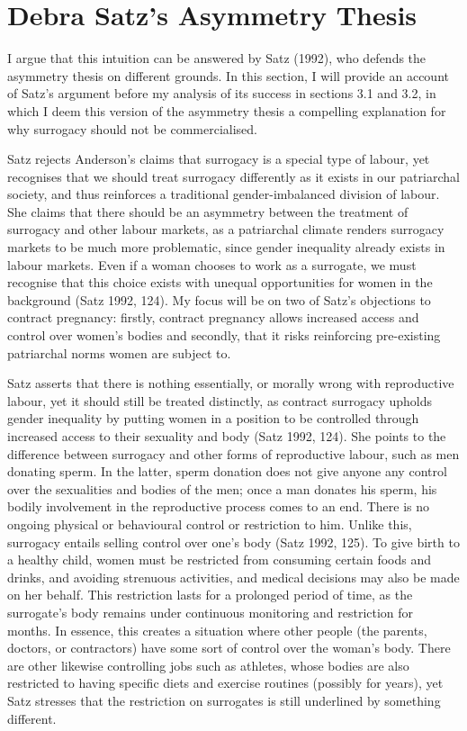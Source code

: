 \renewcommand*{\thesection}{\arabic{section}:}
\section{Debra Satz's Asymmetry Thesis}
  
I argue that this intuition can be answered by Satz
(1992), who defends the asymmetry thesis on different grounds. In this
section, I will provide an account of Satz's argument before my analysis
of its success in sections 3.1 and 3.2, in which I deem this version of
the asymmetry thesis a compelling explanation for why surrogacy should
not be commercialised. 

Satz rejects Anderson's claims that surrogacy is
a special type of labour, yet recognises that we should treat surrogacy
differently as it exists in our patriarchal society, and thus reinforces
a traditional gender-imbalanced division of labour. She claims that
there should be an asymmetry between the treatment of surrogacy and
other labour markets, as a patriarchal climate renders surrogacy markets
to be much more problematic, since gender inequality already exists in
labour markets. Even if a woman chooses to work as a surrogate, we must
recognise that this choice exists with unequal opportunities for women
in the background (Satz 1992, 124). My focus will be on two of Satz's
objections to contract pregnancy: firstly, contract pregnancy allows
increased access and control over women's bodies and secondly, that it
risks reinforcing pre-existing patriarchal norms women are subject to.

Satz asserts that there is nothing essentially, or morally wrong with
reproductive labour, yet it should still be treated distinctly, as
contract surrogacy upholds gender inequality by putting women in a
position to be controlled through increased access to their sexuality
and body (Satz 1992, 124). She points to the difference between surrogacy and
other forms of reproductive labour, such as men donating sperm. In the
latter, sperm donation does not give anyone any control over the
sexualities and bodies of the men; once a man donates his sperm, his
bodily involvement in the reproductive process comes to an end. There is
no ongoing physical or behavioural control or restriction to him. Unlike
this, surrogacy entails selling control over one's body (Satz 1992, 125). To
give birth to a healthy child, women must be restricted from consuming
certain foods and drinks, and avoiding strenuous activities, and medical
decisions may also be made on her behalf. This restriction lasts for a
prolonged period of time, as the surrogate's body remains under
continuous monitoring and restriction for months. In essence, this
creates a situation where other people (the parents, doctors, or
contractors) have some sort of control over the woman's body. There are
other likewise controlling jobs such as athletes, whose bodies are also
restricted to having specific diets and exercise routines (possibly for
years), yet Satz stresses that the restriction on surrogates is still
underlined by something different. 

